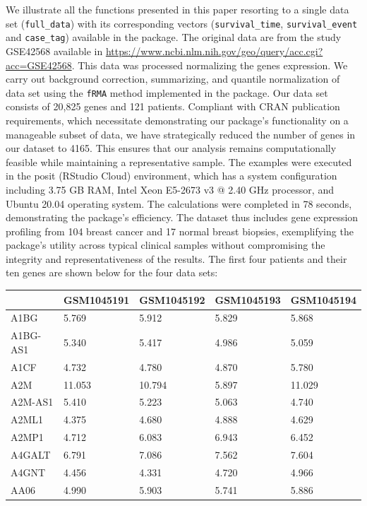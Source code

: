 We illustrate all the functions presented in this paper resorting to a single data set (\texttt{full\_data}) with its corresponding vectors (\texttt{survival\_time}, \texttt{survival\_event} and \texttt{case\_tag}) available in the  package. The original data are from the study GSE42568 available in \url{https://www.ncbi.nlm.nih.gov/geo/query/acc.cgi?acc=GSE42568}. This data was processed normalizing the genes expression. We carry out background correction, summarizing, and quantile normalization of data set using the \texttt{fRMA} method implemented in the  package. Our data set consists of 20,825 genes and 121 patients. Compliant with CRAN publication requirements, which necessitate demonstrating our package's functionality on a manageable subset of data, we have strategically reduced the number of genes in our dataset to 4165. This ensures that our analysis remains computationally feasible while maintaining a representative sample. The examples were executed in the posit (RStudio Cloud) environment, which has a system configuration including 3.75 GB RAM, Intel Xeon E5-2673 v3 @ 2.40 GHz processor, and Ubuntu 20.04 operating system. The calculations were completed in 78 seconds, demonstrating the package's efficiency. The dataset thus includes gene expression profiling from 104 breast cancer and 17 normal breast biopsies, exemplifying the package's utility across typical clinical samples without compromising the integrity and representativeness of the results. The first four patients and their ten genes are shown below for the four data sets:

\begin{tabular}{lllll}
\toprule
  & GSM1045191 & GSM1045192 & GSM1045193 & GSM1045194\\
\midrule
A1BG & 5.769 & 5.912 & 5.829 & 5.868\\
A1BG-AS1 & 5.340 & 5.417 & 4.986 & 5.059\\
A1CF & 4.732 & 4.780 & 4.870 & 5.780\\
A2M & 11.053 & 10.794 & 5.897 & 11.029\\
A2M-AS1 & 5.410 & 5.223 & 5.063 & 4.740\\
\addlinespace
A2ML1 & 4.375 & 4.680 & 4.888 & 4.629\\
A2MP1 & 4.712 & 6.083 & 6.943 & 6.452\\
A4GALT & 6.791 & 7.086 & 7.562 & 7.604\\
A4GNT & 4.456 & 4.331 & 4.720 & 4.966\\
AA06 & 4.990 & 5.903 & 5.741 & 5.886\\
\bottomrule
\end{tabular}

